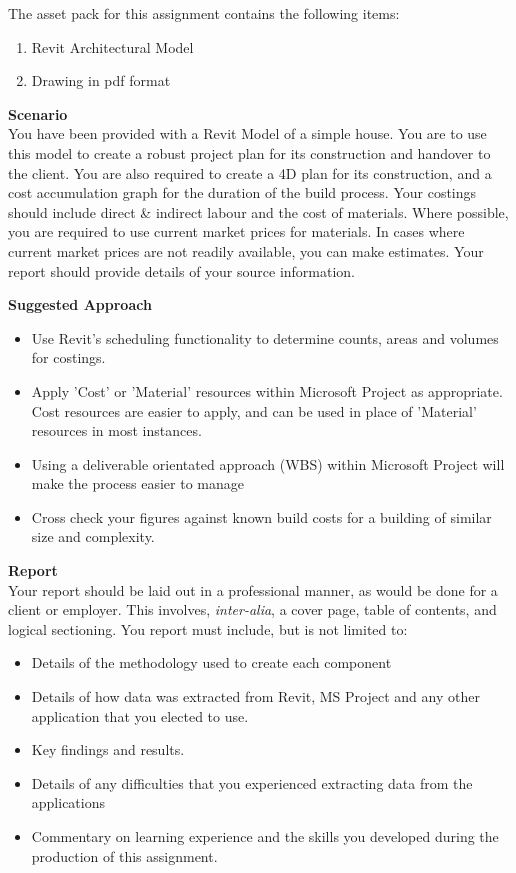 \newpage
The asset pack for this assignment contains the following items:
\begin{enumerate}
	\item Revit Architectural Model
	\item Drawing in pdf format
\end{enumerate}


\textbf{Scenario}\\

You have been provided with a Revit Model of a simple house.  You are to use this model to create a robust project plan for its construction and handover to the client.  You are also required to create a 4D plan for its construction, and a cost accumulation graph for the duration of the build process.  Your costings should include direct \& indirect labour and the cost of materials.  Where possible, you are required to use current market prices for materials.  In cases where current market prices are not readily available, you can make estimates.  Your report should provide details of your source information.


\vspace{.5cm}

\textbf{Suggested Approach}

\begin{itemize}
	\item Use Revit's scheduling functionality to determine counts, areas and volumes for costings.
	\item Apply 'Cost' or 'Material' resources within Microsoft Project as appropriate.  Cost resources are easier to apply, and can be used in place of 'Material' resources in most instances.
	\item Using a deliverable orientated approach (WBS) within Microsoft Project will make the process easier to manage
	\item Cross check your figures against known build costs for a building of similar size and complexity.

\end{itemize}

\newpage
\textbf{Report}\\
Your report should be laid out in a professional manner, as would be done for a client or employer.  This involves, \emph{inter-alia}, a cover page, table of contents, and logical sectioning.  You report must include, but is not limited to:
\begin{itemize}
	\item Details of the methodology used to create each component
	\item Details of how data was extracted from Revit, MS Project and any other application that you elected to use.
	\item Key findings and results.
	\item Details of any difficulties that you experienced extracting data from the applications
	\item Commentary on learning experience and the skills you developed during the production of this assignment.
\end{itemize}
  
